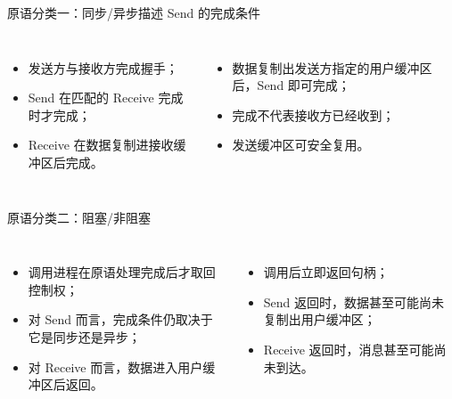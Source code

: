 \documentclass[UTF8,fontset=none,aspectratio=169,10pt]{beamer}
\begin{document}
\begin{frame}{原语分类一：同步/异步描述 Send 的完成条件}
\begin{columns}[T,onlytextwidth]
\begin{itemize}
  \item 发送方与接收方完成握手；
  \item Send 在匹配的 Receive 完成时才完成；
  \item Receive 在数据复制进接收缓冲区后完成。
\end{itemize}
\begin{itemize}
  \item 数据复制出发送方指定的用户缓冲区后，Send 即可完成；
  \item 完成不代表接收方已经收到；
  \item 发送缓冲区可安全复用。
\end{itemize}
\end{columns}
\vfill{}
\end{frame}

\begin{frame}{原语分类二：阻塞/非阻塞}
\begin{columns}[T,onlytextwidth]
\begin{itemize}
  \item 调用进程在原语处理完成后才取回控制权；
  \item 对 Send 而言，完成条件仍取决于它是同步还是异步；
  \item 对 Receive 而言，数据进入用户缓冲区后返回。
\end{itemize}
\begin{itemize}
  \item 调用后立即返回句柄；
  \item Send 返回时，数据甚至可能尚未复制出用户缓冲区；
  \item Receive 返回时，消息甚至可能尚未到达。
\end{itemize}
\end{columns}
\vfill{}
\end{frame}
\end{document}
